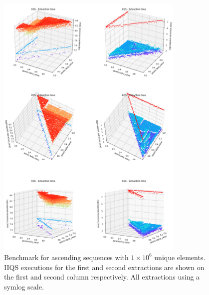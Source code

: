 \begin{figure}[!ht]
    \centering
    \includegraphics[width=0.8\textwidth]{./fragments/04_experimental_execution/images/04_alphabeta_singleclass_asc.png}
    \caption{Benchmark for ascending sequences with $1\times10^6$ unique elements. IIQS executions for the first and second extractions are shown on the first and second column respectively. All extractions using a symlog scale.}
    \label{FIG:05_ALPHABETA_RELATIONSHIP_ASC}
\end{figure}

